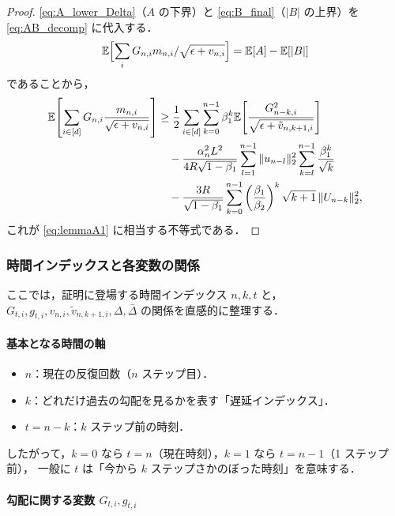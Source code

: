 \documentclass[dvipdfmx,a4paper,11pt]{jsarticle}
\begin{document}
\begin{proof}
\eqref{eq:A_lower_Delta}（$A$ の下界）と
\eqref{eq:B_final}（$|B|$ の上界）を
\eqref{eq:AB_decomp} に代入する．
\[
  \mathbb{E}\Bigl[\sum_i G_{n,i} m_{n,i}/\sqrt{\epsilon+v_{n,i}}\Bigr]
  = \mathbb{E}[A] - \mathbb{E}[|B|]
\]
であることから，
\begin{align}
    \mathbb{E}\!\left[\sum_{i \in [d]} G_{n,i}
      \frac{m_{n,i}}{\sqrt{\epsilon+v_{n,i}}}\right]
    &\geq
    \frac{1}{2} \sum_{i \in [d]} \sum_{k=0}^{n-1} \beta_1^k
    \mathbb{E}\!\left[
      \frac{G_{n-k,i}^2}{\sqrt{\epsilon+\tilde{v}_{n,k+1,i}}}
    \right] \notag\\
    &\quad
    - \frac{\alpha_n^2 L^2}{4R\sqrt{1-\beta_1}}
      \sum_{l=1}^{n-1} \|u_{n-l}\|_2^2
      \sum_{k=l}^{n-1} \frac{\beta_1^k}{\sqrt{k}} \notag\\
    &\quad
    - \frac{3R}{\sqrt{1-\beta_1}}
      \sum_{k=0}^{n-1}
      \left(\frac{\beta_1}{\beta_2}\right)^k \sqrt{k+1}\,\|U_{n-k}\|_2^2,
\end{align}
これが \eqref{eq:lemmaA1} に相当する不等式である．
\end{proof}

\subsubsection*{時間インデックスと各変数の関係}

ここでは，証明に登場する時間インデックス $n, k, t$ と，
$G_{t,i}, g_{t,i}, v_{n,i}, \tilde{v}_{n,k+1,i}, \Delta, \bar{\Delta}$ の関係を直感的に整理する．

\paragraph{基本となる時間の軸}

\begin{itemize}
  \item $n$：現在の反復回数（$n$ ステップ目）．
  \item $k$：どれだけ過去の勾配を見るかを表す「遅延インデックス」．
  \item $t = n-k$：$k$ ステップ前の時刻．
\end{itemize}

したがって，$k=0$ なら $t=n$（現在時刻），$k=1$ なら $t=n-1$（1 ステップ前），
一般に $t$ は「今から $k$ ステップさかのぼった時刻」を意味する．

\paragraph{勾配に関する変数 $G_{t,i}, g_{t,i}$}
\end{document}
